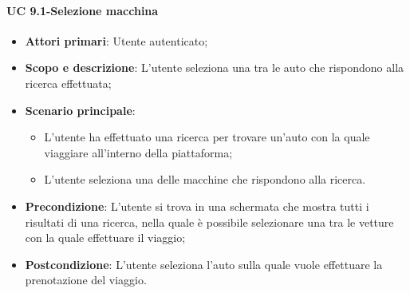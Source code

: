         \paragraph{UC 9.1-Selezione macchina}
    \begin{itemize}
                \item \textbf{Attori primari}: Utente autenticato;
                
                 \item \textbf{Scopo e descrizione}: L’utente seleziona una tra le auto che rispondono alla ricerca effettuata;
                 \item \textbf{Scenario principale}: 
                 \begin{itemize}
                     \item L’utente ha effettuato una ricerca per trovare un'auto  con la quale viaggiare all'interno della piattaforma;
                     \item L'utente seleziona una delle macchine che rispondono alla ricerca.
                     \end{itemize}
                 \item \textbf{Precondizione}: L’utente si trova in una schermata che mostra tutti i risultati di una ricerca, nella quale è possibile selezionare una tra le vetture con la quale effettuare il viaggio;
                 \item \textbf{Postcondizione}: L’utente seleziona l'auto sulla quale vuole effettuare la prenotazione del viaggio.
                 \end{itemize}
                 
